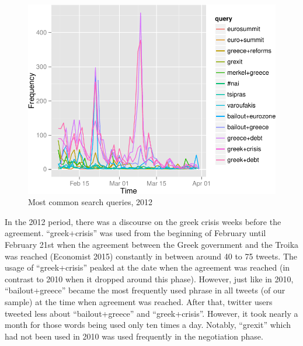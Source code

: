 \documentclass[]{article}
\begin{document}
\begin{figure}

{\centering \includegraphics{fin_paper_files/figure-latex/unnamed-chunk-9-1} 

}

\caption{Most common search queries, 2012}\label{fig:unnamed-chunk-9}
\end{figure}

In the 2012 period, there was a discourse on the greek crisis weeks
before the agreement. ``greek+crisis'' was used from the beginning of
February until February 21st when the agreement between the Greek
government and the Troika was reached (Economist 2015) constantly in
between around 40 to 75 tweets. The usage of ``greek+crisis'' peaked at
the date when the agreement was reached (in contrast to 2010 when it
dropped around this phase). However, just like in 2010,
``bailout+greece'' became the most frequently used phrase in all tweets
(of our sample) at the time when agreement was reached. After that,
twitter users tweeted less about ``bailout+greece'' and
``greek+crisis''. However, it took nearly a month for those words being
used only ten times a day. Notably, ``grexit'' which had not been used
in 2010 was used frequently in the negotiation phase.
\end{document}
